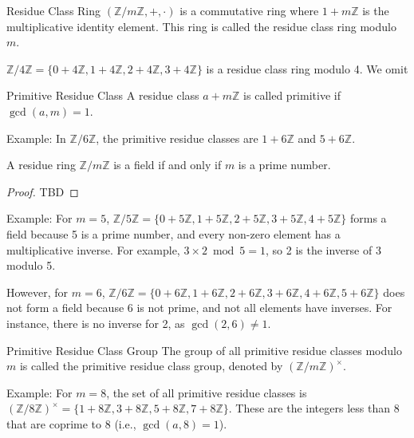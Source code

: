 \documentclass{article}
\begin{document}
\begin{definition}{Residue Class Ring}{}
$(\mathbb{Z} / m \mathbb{Z}, +, \cdot)$ is a commutative ring where $1 + m \mathbb{Z}$ is the multiplicative identity element. This ring is called the residue class ring modulo $m$.
\end{definition}

$\mathbb{Z}/4\mathbb{Z} = \{0 + 4\mathbb{Z}, 1 + 4\mathbb{Z}, 2 + 4\mathbb{Z}, 3 + 4\mathbb{Z}\}$ is a residue class ring modulo 4. We omit 

\begin{definition}{Primitive Residue Class}{}
A residue class $a + m\mathbb{Z}$ is called primitive if $\gcd(a, m) = 1$.
\end{definition}

Example: In $\mathbb{Z}/6\mathbb{Z}$, the primitive residue classes are $1 + 6\mathbb{Z}$ and $5 + 6\mathbb{Z}$.

\begin{theorem}{}{}
A residue ring $\mathbb{Z} / m\mathbb{Z}$ is a field if and only if $m$ is a prime number.
\end{theorem}

\begin{proof}
    TBD
\end{proof}

Example: For $m = 5$, $\mathbb{Z}/5\mathbb{Z} = \{0 + 5\mathbb{Z}, 1 + 5\mathbb{Z}, 2 + 5\mathbb{Z}, 3 + 5\mathbb{Z}, 4 + 5\mathbb{Z}\}$ forms a field because 5 is a prime number, and every non-zero element has a multiplicative inverse. For example, $3 \times 2 \bmod 5 = 1$, so 2 is the inverse of 3 modulo 5.

However, for $m = 6$, $\mathbb{Z}/6\mathbb{Z} = \{0 + 6\mathbb{Z}, 1+ 6\mathbb{Z}, 2+ 6\mathbb{Z}, 3+ 6\mathbb{Z}, 4+ 6\mathbb{Z}, 5+ 6\mathbb{Z}\}$ does not form a field because 6 is not prime, and not all elements have inverses. For instance, there is no inverse for 2, as $\gcd(2, 6) \neq 1$.

\begin{definition}{Primitive Residue Class Group}{}
The group of all primitive residue classes modulo $m$ is called the primitive residue class group, denoted by $(\mathbb{Z}/m\mathbb{Z})^{\times}$.
\end{definition}

Example: For $m = 8$, the set of all primitive residue classes is $(\mathbb{Z}/8\mathbb{Z})^{\times} = \{1 + 8\mathbb{Z}, 3 + 8\mathbb{Z}, 5 + 8\mathbb{Z}, 7 + 8\mathbb{Z}\}$. These are the integers less than 8 that are coprime to 8 (i.e., $\gcd(a, 8) = 1$).
\end{document}
